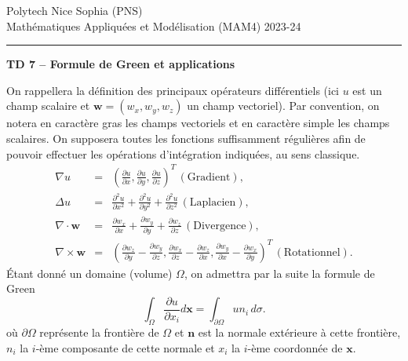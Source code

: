 \documentclass[12pt,a4paper]{article}
\begin{document}
 \hfill Polytech Nice Sophia (PNS)\\
\noindent Math\'ematiques Appliqu\'ees et Mod\'elisation (MAM4) \hfill 2023-24 \\

\hrule

\bigskip
\bigskip

\begin{center} {\bf TD 7 -- Formule de Green et applications} \end{center}

\bigskip

\noindent On rappellera la d\'efinition des principaux op\'erateurs
diff\'erentiels (ici $u$ est un champ scalaire et $\mathbf{w} =
(w_x,w_y,w_z)$ un champ vectoriel). Par convention, on notera en caract\`ere gras les champs vectoriels et en
caract\`ere simple les champs scalaires. On supposera toutes les fonctions suffisamment r\'eguli\`eres afin de
  pouvoir effectuer les op\'erations d'int\'egration indiqu\'ees, au sens classique.
$$
\begin{array}{lcl}
\nabla u &=& \displaystyle\left(\frac{\partial u}{\partial
    x},\frac{\partial u}{\partial y }, \frac{\partial u}{\partial
    z}\right)^T \, (\mbox{Gradient}), \\[2ex]
\Delta u &=& \displaystyle \frac{\partial^2 u}{\partial
    x^2}+\frac{\partial^2 u}{\partial y^2 }+\frac{\partial^2 u}{\partial
    z^2} \, (\mbox{Laplacien}), \\[2ex]
\nabla\cdot \mathbf{w} &=&  \displaystyle\frac{\partial w_x}{\partial x} +
\frac{\partial w_y}{\partial y} +\frac{\partial w_z}{\partial z}\,  (\mbox{Divergence}),\\[2ex]
 \nabla\times \mathbf{w} &=&  \displaystyle\left(\frac{\partial w_z}{\partial y}
   -\frac{\partial w_y}{\partial z},\frac{\partial w_x}{\partial z}
   -\frac{\partial w_z}{\partial x}, \frac{\partial w_y}{\partial x}
   -\frac{\partial w_x}{\partial y}  \right)^T \, (\mbox{Rotationnel}).
\end{array}
$$
\'Etant donn\'e un domaine (volume) $\Omega$, on admettra par la
suite la formule de Green
$$
\int_{\Omega} \frac{\partial u}{\partial x_i} d\mathbf{x}
= \int_{\partial\Omega}u n_i \, d\sigma.
$$
o\`u $\partial\Omega$ repr\'esente la fronti\`ere de $\Omega$ et
$\mathbf{n}$ est la normale ext\'erieure à cette fronti\`ere, $n_i$
la $i$-\`eme composante de cette normale et $x_i$ la $i$-\`eme
coordonn\'ee de $\mathbf{x}$.\\
\end{document}
